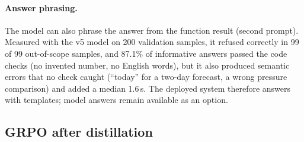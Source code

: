 \begin{table}[t]
\centering\small
\setlength{\tabcolsep}{2.5pt}
\caption{The deployed model (v6.1 seed 42) on the frozen test sets. HF: unquantized, batched bf16 on GPU. The other columns
are GGUF on the same laptop CPU in one session; latency in ms per decision (p95: 2,075 / 1,480 / 832). The threshold does not
change the model's own clarifications, so the ambiguous rows of the last two columns are identical.}
\label{tab:deploy}
\end{table}

\paragraph{Answer phrasing.}
\label{sec:turn2}
The model can also phrase the answer from the function result (second prompt). Measured with the v5 model on 200 validation
samples, it refused
correctly in 99 of 99 out-of-scope samples, and 87.1\% of informative answers passed the code checks (no invented number, no
English words), but it also produced semantic errors that no check caught (``today'' for a two-day forecast, a wrong pressure
comparison) and added a median 1.6\,s. The deployed system therefore answers with templates; model answers remain available
as an option.

\subsection{GRPO after distillation}
\label{sec:grpo}

